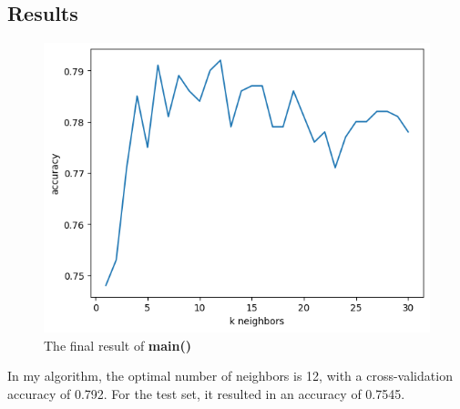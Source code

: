 \documentclass[12pt]{article}
\begin{document}
\subsection{Results}

\begin{figure}[!h]
    \centering
    \includegraphics[scale=0.5]{./figures/output.png}
    \caption{The final result of \textbf{main()}}
\end{figure}

In my algorithm, the optimal number of neighbors is 12, with a cross-validation accuracy of 0.792. For the test set, it resulted in an accuracy of 0.7545.
\end{document}
